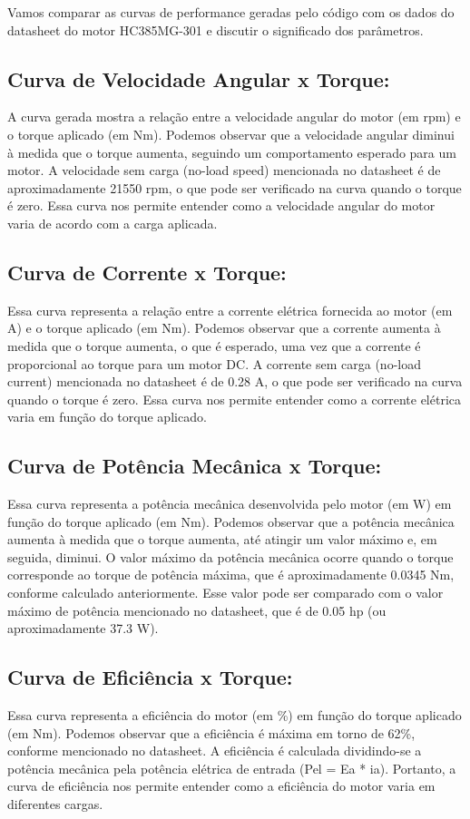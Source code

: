\documentclass[a4paper, 12pt]{article}
\begin{document}
Vamos comparar as curvas de performance geradas pelo código com os dados do datasheet do motor HC385MG-301 e discutir o significado dos parâmetros.\\

\subsection{Curva de Velocidade Angular x Torque:}
A curva gerada mostra a relação entre a velocidade angular do motor (em rpm) e o torque aplicado (em Nm). Podemos observar que a velocidade angular diminui à medida que o torque aumenta, seguindo um comportamento esperado para um motor. A velocidade sem carga (no-load speed) mencionada no datasheet é de aproximadamente 21550 rpm, o que pode ser verificado na curva quando o torque é zero. Essa curva nos permite entender como a velocidade angular do motor varia de acordo com a carga aplicada.

\subsection{Curva de Corrente x Torque:}
Essa curva representa a relação entre a corrente elétrica fornecida ao motor (em A) e o torque aplicado (em Nm). Podemos observar que a corrente aumenta à medida que o torque aumenta, o que é esperado, uma vez que a corrente é proporcional ao torque para um motor DC. A corrente sem carga (no-load current) mencionada no datasheet é de 0.28 A, o que pode ser verificado na curva quando o torque é zero. Essa curva nos permite entender como a corrente elétrica varia em função do torque aplicado.

\subsection{Curva de Potência Mecânica x Torque:}
Essa curva representa a potência mecânica desenvolvida pelo motor (em W) em função do torque aplicado (em Nm). Podemos observar que a potência mecânica aumenta à medida que o torque aumenta, até atingir um valor máximo e, em seguida, diminui. O valor máximo da potência mecânica ocorre quando o torque corresponde ao torque de potência máxima, que é aproximadamente 0.0345 Nm, conforme calculado anteriormente. Esse valor pode ser comparado com o valor máximo de potência mencionado no datasheet, que é de 0.05 hp (ou aproximadamente 37.3 W).

\subsection{Curva de Eficiência x Torque:}
Essa curva representa a eficiência do motor (em \%) em função do torque aplicado (em Nm). Podemos observar que a eficiência é máxima em torno de 62\%, conforme mencionado no datasheet. A eficiência é calculada dividindo-se a potência mecânica pela potência elétrica de entrada (Pel = Ea * ia). Portanto, a curva de eficiência nos permite entender como a eficiência do motor varia em diferentes cargas.\\
\end{document}
